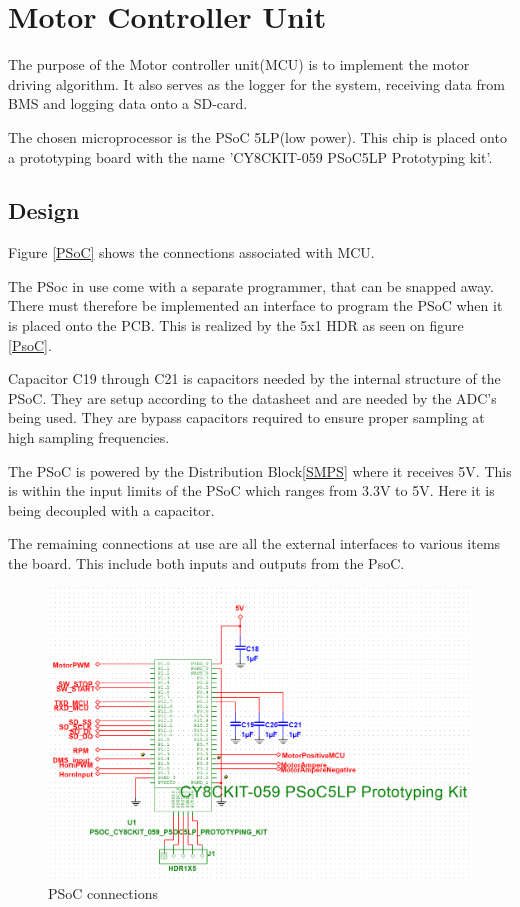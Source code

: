 \section{Motor Controller Unit}
\label{sec:MCU}
The purpose of the Motor controller unit(MCU) is to implement the motor driving algorithm. It also serves as the logger for the system, receiving data from BMS and logging data onto a SD-card. 

The chosen microprocessor is the PSoC 5LP(low power). This chip is placed onto a prototyping board with the name 'CY8CKIT-059 PSoC5LP Prototyping kit'.

\subsection{Design}

Figure \vref{PSoC} shows the connections associated with MCU. 

The PSoc in use come with a separate programmer, that can be snapped away. There must therefore be implemented an interface to program the PSoC when it is placed onto the PCB. This is realized by the 5x1 HDR as seen on figure \vref{PsoC}.

Capacitor C19 through C21 is capacitors needed by the internal structure of the PSoC. They are setup according to the datasheet and are needed by the ADC's being used. They are bypass capacitors required to ensure proper sampling at high sampling frequencies.

The PSoC is powered by the Distribution Block\vref{SMPS} where it receives 5V. This is within the input limits of the PSoC which ranges from 3.3V to 5V. Here it is being decoupled with a capacitor.  

The remaining connections at use are all the external interfaces to various items the board. This include both inputs and outputs from the PsoC. 

\begin{figure}[H]
	\centering
	\includegraphics[width=0.7\linewidth]{Hardware/Pictures/PSoC}
	\caption{PSoC connections}
	\label{fig:PSoC}
\end{figure}

